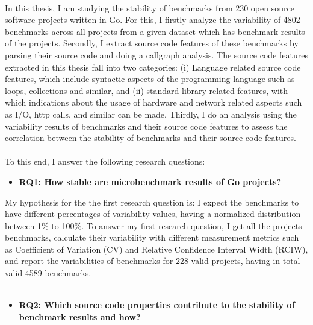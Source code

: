 \documentclass{seal_thesis}
\begin{document}
\\
In this thesis, I am studying the stability of benchmarks from 230 open source software projects written in Go. For this, I firstly analyze the variability of 4802 benchmarks across all projects from a given dataset which has benchmark results of the projects. Secondly, I extract source code features of these benchmarks by parsing their source code and doing a callgraph analysis. The source code features extracted in this thesis fall into two categories: (i) Language related source code features, which include syntactic aspects of the programming language such as loops, collections and similar, and (ii) standard library related features, with which indications about the usage of hardware and network related aspects such as I/O, http calls, and similar can be made. Thirdly, I do an analysis using the variability results of benchmarks and their source code features to assess the correlation between the stability of benchmarks and their source code features.\\
\\
To this end, I answer the following research questions: 

\begin{itemize}
	\item \textbf{RQ1: How stable are microbenchmark results of Go projects?}
\end{itemize}

\noindent My hypothesis for the the first research question is: I expect the benchmarks to have different percentages of variability values, having a normalized distribution between 1\% to 100\%. To answer my first research question, I get all the projects benchmarks, calculate their variability with different measurement metrics such as Coefficient of Variation (CV) and Relative Confidence Interval Width (RCIW), and report the variabilities of benchmarks for 228 valid projects, having in total valid 4589 benchmarks.\\
\\
\begin{itemize}
	\item \textbf{RQ2: Which source code properties contribute to the stability of benchmark results and how?}
\end{itemize}
\end{document}
